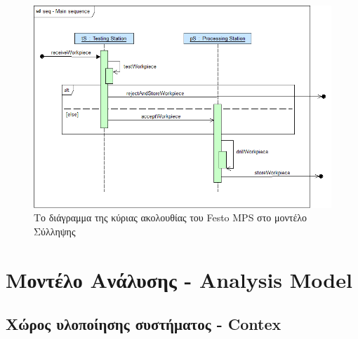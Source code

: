\documentclass[a4paper,12pt,twoside]{report}
\begin{document}
\begin{appendices}
\begin{figure}[hp]
				\end{figure}
				\begin{figure}[hp]
					\centering
					\includegraphics[scale=0.45]{ConceptionalModel_seq-MainSequence.png}
					\caption{Το διάγραμμα της κύριας ακολουθίας του Festo MPS στο μοντέλο Σύλληψης}
					\label{φωτ:Το διάγραμμα της κύριας ακολουθίας του Festo MPS στο μοντέλο Σύλληψης}
				\end{figure}

		\FloatBarrier		
		\section{Μοντέλο Ανάλυσης - Analysis Model}
		
			\FloatBarrier
			\subsection{Χώρος υλοποίησης συστήματος - Contex}


\end{appendices}
\end{document}
